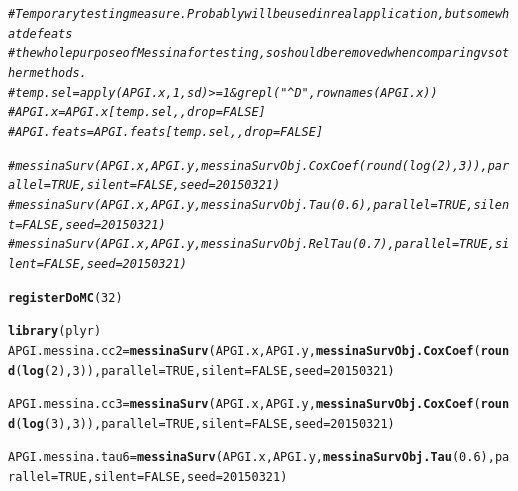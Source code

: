 \documentclass{article}\usepackage[]{graphicx}\usepackage[]{color}
\makeatletter
\newcommand{\hlnum}[1]{\textcolor[rgb]{0.686,0.059,0.569}{#1}}%
\newcommand{\hlcom}[1]{\textcolor[rgb]{0.678,0.584,0.686}{\textit{#1}}}%
\newcommand{\hlstd}[1]{\textcolor[rgb]{0.345,0.345,0.345}{#1}}%
\newcommand{\hlkwb}[1]{\textcolor[rgb]{0.69,0.353,0.396}{#1}}%
\newcommand{\hlkwc}[1]{\textcolor[rgb]{0.333,0.667,0.333}{#1}}%
\newcommand{\hlkwd}[1]{\textcolor[rgb]{0.737,0.353,0.396}{\textbf{#1}}}%
\newenvironment{kframe}{%
 \def\at@end@of@kframe{}%
 \ifinner\ifhmode%
  \def\at@end@of@kframe{\end{minipage}}%
  \begin{minipage}{\columnwidth}%
 \fi\fi%
 \def\FrameCommand##1{\hskip\@totalleftmargin \hskip-\fboxsep
 \colorbox{shadecolor}{##1}\hskip-\fboxsep
     \hskip-\linewidth \hskip-\@totalleftmargin \hskip\columnwidth}%
 \MakeFramed {\advance\hsize-\width
   \@totalleftmargin\z@ \linewidth\hsize
   \@setminipage}}%
 {\par\unskip\endMakeFramed%
 \at@end@of@kframe}
\newenvironment{knitrout}{}{} %
\makeatother
\begin{document}
\begin{knitrout}
\color{fgcolor}\begin{kframe}
\begin{alltt}
\hlcom{# Temporary testing measure.  Probably will be used in real application, but somewhat defeats}
\hlcom{# the whole purpose of Messina for testing, so should be removed when comparing vs other methods.}
\hlcom{# temp.sel = apply(APGI.x, 1, sd) >= 1 & grepl("^D", rownames(APGI.x))}
\hlcom{# APGI.x = APGI.x[temp.sel,,drop = FALSE]}
\hlcom{# APGI.feats = APGI.feats[temp.sel,,drop = FALSE]}

\hlcom{# messinaSurv(APGI.x, APGI.y, messinaSurvObj.CoxCoef(round(log(2), 3)), parallel = TRUE, silent = FALSE, seed = 20150321)}
\hlcom{# messinaSurv(APGI.x, APGI.y, messinaSurvObj.Tau(0.6), parallel = TRUE, silent = FALSE, seed = 20150321)}
\hlcom{# messinaSurv(APGI.x, APGI.y, messinaSurvObj.RelTau(0.7), parallel = TRUE, silent = FALSE, seed = 20150321)}

\hlkwd{registerDoMC}\hlstd{(}\hlnum{32}\hlstd{)}

\hlkwd{library}\hlstd{(plyr)}
\hlstd{APGI.messina.cc2} \hlkwb{=} \hlkwd{messinaSurv}\hlstd{(APGI.x, APGI.y,} \hlkwd{messinaSurvObj.CoxCoef}\hlstd{(}\hlkwd{round}\hlstd{(}\hlkwd{log}\hlstd{(}\hlnum{2}\hlstd{),} \hlnum{3}\hlstd{)),} \hlkwc{parallel} \hlstd{=} \hlnum{TRUE}\hlstd{,} \hlkwc{silent} \hlstd{=} \hlnum{FALSE}\hlstd{,} \hlkwc{seed} \hlstd{=} \hlnum{20150321}\hlstd{)}
\end{alltt}


{\ttfamily\noindent\itshape\color{messagecolor}{\#\# Performance bootstrapping...\\\#\# Final training...}}\begin{alltt}
\hlstd{APGI.messina.cc3} \hlkwb{=} \hlkwd{messinaSurv}\hlstd{(APGI.x, APGI.y,} \hlkwd{messinaSurvObj.CoxCoef}\hlstd{(}\hlkwd{round}\hlstd{(}\hlkwd{log}\hlstd{(}\hlnum{3}\hlstd{),} \hlnum{3}\hlstd{)),} \hlkwc{parallel} \hlstd{=} \hlnum{TRUE}\hlstd{,} \hlkwc{silent} \hlstd{=} \hlnum{FALSE}\hlstd{,} \hlkwc{seed} \hlstd{=} \hlnum{20150321}\hlstd{)}
\end{alltt}


{\ttfamily\noindent\itshape\color{messagecolor}{\#\# Performance bootstrapping...\\\#\# Final training...}}\begin{alltt}
\hlstd{APGI.messina.tau6} \hlkwb{=} \hlkwd{messinaSurv}\hlstd{(APGI.x, APGI.y,} \hlkwd{messinaSurvObj.Tau}\hlstd{(}\hlnum{0.6}\hlstd{),} \hlkwc{parallel} \hlstd{=} \hlnum{TRUE}\hlstd{,} \hlkwc{silent} \hlstd{=} \hlnum{FALSE}\hlstd{,} \hlkwc{seed} \hlstd{=} \hlnum{20150321}\hlstd{)}
\end{alltt}



\end{kframe}
\end{knitrout}
\end{document}
